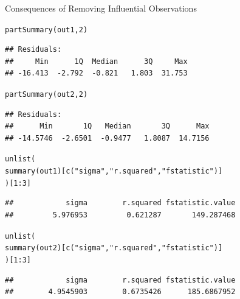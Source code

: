 \documentclass{beamer}\usepackage[]{graphicx}\usepackage[]{color}
\makeatletter
\newcommand{\hlnum}[1]{\textcolor[rgb]{0.69,0.494,0}{#1}}%
\newcommand{\hlstr}[1]{\textcolor[rgb]{0.749,0.012,0.012}{#1}}%
\newcommand{\hlopt}[1]{\textcolor[rgb]{0,0,0}{#1}}%
\newcommand{\hlstd}[1]{\textcolor[rgb]{0,0,0}{#1}}%
\newcommand{\hlkwd}[1]{\textcolor[rgb]{0.004,0.004,0.506}{#1}}%
\newenvironment{kframe}{%
 \def\at@end@of@kframe{}%
 \ifinner\ifhmode%
  \def\at@end@of@kframe{\end{minipage}}%
  \begin{minipage}{\columnwidth}%
 \fi\fi%
 \def\FrameCommand##1{\hskip\@totalleftmargin \hskip-\fboxsep
 \colorbox{shadecolor}{##1}\hskip-\fboxsep
     \hskip-\linewidth \hskip-\@totalleftmargin \hskip\columnwidth}%
 \MakeFramed {\advance\hsize-\width
   \@totalleftmargin\z@ \linewidth\hsize
   \@setminipage}}%
 {\par\unskip\endMakeFramed%
 \at@end@of@kframe}
\newenvironment{knitrout}{}{} %
\makeatother
\begin{document}
\begin{frame}{Consequences of Removing Influential 
    Observations}
\begin{knitrout}\footnotesize
{}\color{fgcolor}\begin{kframe}
\begin{alltt}
\hlkwd{partSummary}\hlstd{(out1,} \hlnum{2}\hlstd{)}
\end{alltt}
\begin{verbatim}
## Residuals:
##     Min      1Q  Median      3Q     Max 
## -16.413  -2.792  -0.821   1.803  31.753
\end{verbatim}
\begin{alltt}
\hlkwd{partSummary}\hlstd{(out2,} \hlnum{2}\hlstd{)}
\end{alltt}
\begin{verbatim}
## Residuals:
##      Min       1Q   Median       3Q      Max 
## -14.5746  -2.6501  -0.9477   1.8087  14.7156
\end{verbatim}
\end{kframe}
\end{knitrout}

\pagebreak

\begin{knitrout}\footnotesize
{}\color{fgcolor}\begin{kframe}
\begin{alltt}
\hlkwd{unlist}\hlstd{(}
    \hlkwd{summary}\hlstd{(out1)[}\hlkwd{c}\hlstd{(}\hlstr{"sigma"}\hlstd{,} \hlstr{"r.squared"}\hlstd{,} \hlstr{"fstatistic"}\hlstd{)]}
\hlstd{)[}\hlnum{1} \hlopt{:} \hlnum{3}\hlstd{]}
\end{alltt}
\begin{verbatim}
##            sigma        r.squared fstatistic.value 
##         5.976953         0.621287       149.287468
\end{verbatim}
\begin{alltt}
\hlkwd{unlist}\hlstd{(}
    \hlkwd{summary}\hlstd{(out2)[}\hlkwd{c}\hlstd{(}\hlstr{"sigma"}\hlstd{,} \hlstr{"r.squared"}\hlstd{,} \hlstr{"fstatistic"}\hlstd{)]}
\hlstd{)[}\hlnum{1} \hlopt{:} \hlnum{3}\hlstd{]}
\end{alltt}
\begin{verbatim}
##            sigma        r.squared fstatistic.value 
##        4.9545903        0.6735426      185.6867952
\end{verbatim}
\end{kframe}
\end{knitrout}

\end{frame}
\end{document}
